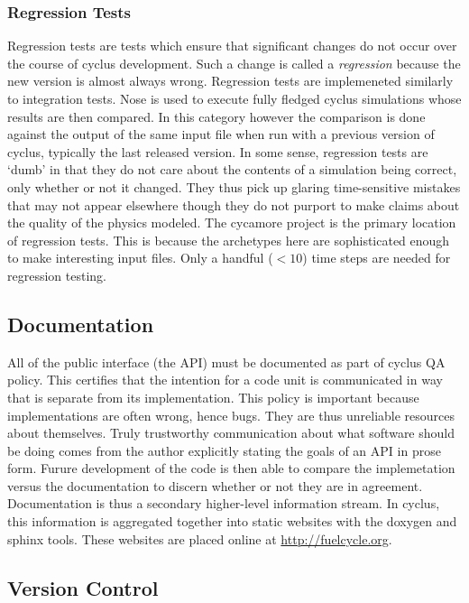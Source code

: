 \subsubsection{Regression Tests}

Regression tests are tests which ensure that significant changes do not 
occur over the course of cyclus development. Such a change is called a 
\emph{regression} because the new version is almost always wrong.
Regression tests are implemeneted similarly to integration tests.
Nose is used to execute fully fledged cyclus simulations whose results
are then compared. In this category however the comparison is done against 
the output of the same input file when run with a previous version of cyclus, 
typically the last released version.
In some sense, regression tests are `dumb' in that they do 
not care about the contents of a simulation being correct, only whether or not 
it changed. They thus pick up glaring time-sensitive mistakes that may 
not appear elsewhere though they do not purport to make claims about the
quality of the physics modeled. The cycamore project is the primary location of
regression tests. This is because the archetypes here are sophisticated enough
to make interesting input files. Only a handful ($<10$) time steps are needed 
for regression testing.

\subsection{Documentation}

All of the public interface (the API) must be documented as part of cyclus
QA policy. This certifies that the intention for a code unit is communicated 
in way that is separate from its implementation. This policy is important 
because implementations are often wrong, hence bugs. They are thus unreliable 
resources about themselves. Truly trustworthy communication about what 
software should be doing comes from the author explicitly stating the 
goals of an API in prose form. Furure development of the code is then able to 
compare the implemetation versus the documentation to discern whether or not they 
are in agreement. Documentation is thus a secondary higher-level information 
stream.  In cyclus, this information is aggregated together into static 
websites with the doxygen \cite{van2008doxygen} and sphinx \cite{brandl2014sphinx} 
tools. These websites are placed online at \url{http://fuelcycle.org}.

\subsection{Version Control}

